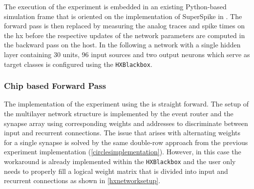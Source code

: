 The execution of the experiment is embedded in an existing Python-based simulation frame that is oriented on the implementation of SuperSpike in \citealp{zenke2018superspike}. The forward pass is then replaced by measuring the analog traces and spike times on the \gls{hx} before the respective updates of the network parameters are computed in the backward pass on the host. In the following a network with a single hidden layer containing 30 units, 96 input sources and two output neurons which serve as target classes is configured using the \texttt{HXBlackbox}.

\subsubsection{Chip based Forward Pass}
The implementation of the experiment using the  is straight forward. The setup of the multilayer network structure is implemented by the event router and the synapse array using corresponding weights and addresses to discriminate between input and recurrent connections. The issue that arises with alternating weights for a single synapse is solved by the same double-row approach from the previous experiment implementation (\cref{circlesimplementation}). However, in this case the workaround is already implemented within the \texttt{HXBlackbox} and the user only needs to properly fill a logical weight matrix that is divided into input and recurrent connections as shown in \cref{hxnetworksetup}.

